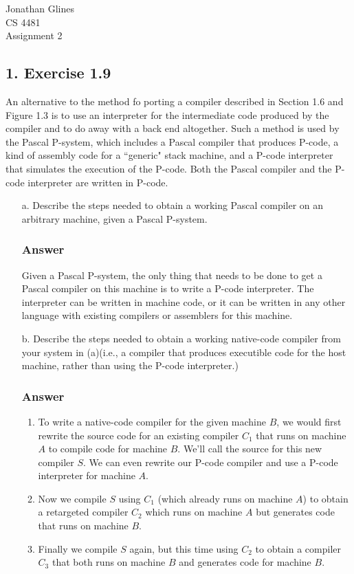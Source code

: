 \documentclass[12pt]{article}
\begin{document}
\begin{flushright}
{
\Large Jonathan Glines\\
\Large CS 4481\\
\Large Assignment 2\\
}
\end{flushright}
\subsection*{1. Exercise 1.9}
An alternative to the method fo porting a compiler described in Section 1.6 and Figure 1.3 is to use an interpreter for the intermediate code produced by the compiler and to do away with a back end altogether. Such a method is used by the Pascal P-system, which includes a Pascal compiler that produces P-code, a kind of assembly code for a ``generic" stack machine, and a P-code interpreter that simulates the execution of the P-code. Both the Pascal compiler and the P-code interpreter are written in P-code.
\begin{itemize}
\item[a.] Describe the steps needed to obtain a working Pascal compiler on an arbitrary machine, given a Pascal P-system.
\subsubsection*{Answer}
Given a Pascal P-system, the only thing that needs to be done to get a Pascal compiler on this machine is to write a P-code interpreter. The interpreter can be written in machine code, or it can be written in any other language with existing compilers or assemblers for this machine.

\item[b.] Describe the steps needed to obtain a working native-code compiler from your system in (a)(i.e., a compiler that produces executible code for the host machine, rather than using the P-code interpreter.)
\subsubsection*{Answer}
\begin{enumerate}
\item To write a native-code compiler for the given machine $B$, we would first rewrite the source code for an existing compiler $C_1$ that runs on machine $A$ to compile code for machine $B$. We'll call the source for this new compiler $S$. We can even rewrite our P-code compiler and use a P-code interpreter for machine $A$.
\item Now we compile $S$ using $C_1$ (which already runs on machine $A$) to obtain a retargeted compiler $C_2$ which runs on machine $A$ but generates code that runs on machine $B$.
\item Finally we compile $S$ again, but this time using $C_2$ to obtain a compiler $C_3$ that both runs on machine $B$ and generates code for machine $B$.
\end{enumerate}
\end{itemize}
\end{document}
